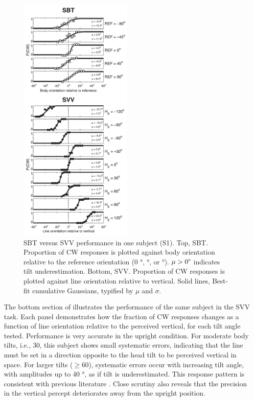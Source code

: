 \begin{figure}
    \includegraphics[width=0.5\textwidth]{src/paper1/figure3.pdf}

    \caption{SBT versus SVV performance in one subject (S1). Top, SBT. Proportion of CW responses is plotted against body orientation relative to the reference orientation (0 \si{\degree},  \si{\degree}, or  \si{\degree}). $\mu > 0\degree$ indicates tilt underestimation. Bottom, SVV. Proportion of CW responses is plotted against line orientation relative to vertical. Solid lines, Best-fit cumulative Gaussians, typified by $\mu$ and $\sigma$.}
    \label{p1:fig3}
\end{figure}

The bottom section of  illustrates the performance of the same subject in the SVV task. Each panel demonstrates how the fraction of CW responses changes as a function of line orientation relative to the perceived vertical, for each tilt angle tested. Performance is very accurate in the upright condition. For moderate body tilts, i.e., 30\textdegree, this subject shows small systematic errors, indicating that the line must be set in a direction opposite to the head tilt to be perceived vertical in space. For larger tilts ($\ge 60$), systematic errors occur with increasing tilt angle, with amplitudes up to 40 \si{\degree}, as if tilt is underestimated. This response pattern is consistent with previous literature \cite{aubert1861, udodehaes1970, mittelstaedt1983, vanbeuzekom2000}. Close scrutiny also reveals that the precision in the vertical percept deteriorates away from the upright position.

